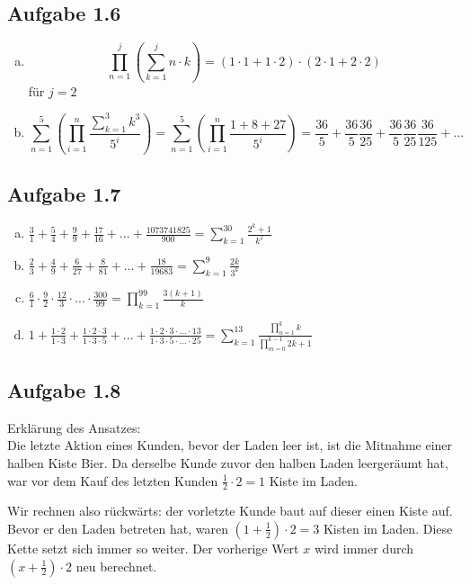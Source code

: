 \documentclass{standalone}
\begin{document}
\subsection{Aufgabe 1.6}

\begin{enumerate}[a)]
    \item \[\prod_{n=1}^{j}(\sum_{k=1}^{j}n \cdot k) = (1 \cdot 1 + 
    1 \cdot 2 ) \cdot (2 \cdot 1 + 2 \cdot 2)  \] 
    für $j = 2$
    \item \[\sum_{n=1}^{5}(\prod_{i=1}^{n} \frac{\sum_{k=1}^{3}k^3}{5^i}) = 
    \sum_{n=1}^{5}(\prod_{i=1}^{n} \frac{1+8+27}{5^i}) =
    \frac{36}{5} + \frac{36}{5}\frac{36}{25} + \frac{36}{5}\frac{36}{25}\frac{36}{125} + ... \]
\end{enumerate}

\subsection{Aufgabe 1.7}
\begin{enumerate}[a)]
    \item $\frac{3}{1}+\frac{5}{4}+\frac{9}{9}+\frac{17}{16}+...+\frac{1073741825}{900} = \sum_{k=1}^{30}\frac{2^k+1}{k^2}$
    \item $\frac{2}{3}+\frac{4}{9}+\frac{6}{27}+\frac{8}{81}+...+\frac{18}{19683} = \sum_{k=1}^{9}\frac{2k}{3^k}$
    \item $\frac{6}{1}\cdot\frac{9}{2}\cdot\frac{12}{3}\cdot...\cdot\frac{300}{99} = \prod_{k=1}^{99}\frac{3(k+1)}{k}$
    \item $1 + \frac{1 \cdot 2}{1 \cdot 3} + \frac{1 \cdot 2 \cdot 3}{1 \cdot 3 \cdot 5} + ... + \frac{1\cdot 2\cdot 3\cdot ... \cdot 13}{1\cdot 3\cdot 5\cdot ... \cdot 25} = 
    \sum_{k=1}^{13}\frac{\prod_{n=1}^{k}k}{\prod_{m=0}^{k-1}2k+1}$
\end{enumerate}

\subsection{Aufgabe 1.8}
Erklärung des Ansatzes: \\
Die letzte Aktion eines Kunden, bevor der Laden leer ist, ist die Mitnahme einer halben Kiste Bier.
Da derselbe Kunde zuvor den halben Laden leergeräumt hat, war vor dem Kauf des letzten Kunden
$\frac{1}{2} \cdot 2 = 1$ Kiste im Laden.

Wir rechnen also rückwärts: der vorletzte Kunde baut auf dieser einen Kiste auf.
Bevor er den Laden betreten hat, waren $(1 + \frac{1}{2}) \cdot 2 = 3$ Kisten im Laden.
Diese Kette setzt sich immer so weiter. Der vorherige Wert $x$ wird immer durch $(x + \frac{1}{2}) \cdot 2$ neu berechnet.
\end{document}
